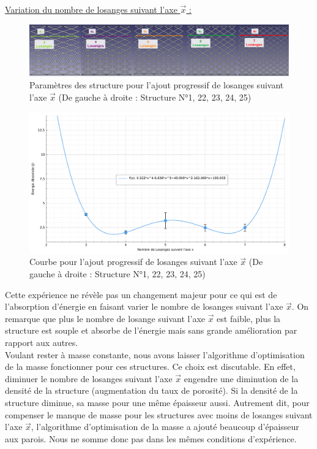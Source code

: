 \documentclass[a4paper]{article}
\begin{document}
	\underline{Variation du nombre de losanges suivant l'axe $\vec{x}$ :}
	
	\begin{figure}[H]
		\centering
		\includegraphics[width=14cm]{Images/7/7_4/7_4_8/gradient_losange_x.pdf}
		\caption{Paramètres des structure pour l'ajout progressif de losanges suivant l'axe $\vec{x}$ (De gauche à droite : Structure N°1, 22, 23, 24, 25)}
	\end{figure}

	\begin{figure}[H]
		\centering
		\includegraphics[width=13cm]{Images/7/7_4/7_4_8/nb_losange_x.pdf}
		\caption{Courbe pour l'ajout progressif de losanges suivant l'axe $\vec{x}$ (De gauche à droite : Structure N°1, 22, 23, 24, 25)}
	\end{figure}

	Cette expérience ne révèle pas un changement majeur pour ce qui est de l'absorption d'énergie en faisant varier le nombre de losanges suivant l'axe $\vec{x}$. On remarque que plus le nombre de losange suivant l'axe $\vec{x}$ est faible, plus la structure est souple et absorbe de l'énergie mais sans grande amélioration par rapport aux autres.\\
	
	Voulant rester à masse constante, nous avons laisser l'algorithme d'optimisation de la masse fonctionner pour ces structures. Ce choix est discutable. En effet, diminuer le nombre de losanges suivant l'axe $\vec{x}$ engendre une diminution de la densité de la structure (augmentation du taux de porosité). Si la densité de la structure diminue, sa masse pour une même épaisseur aussi. Autrement dit, pour compenser le manque de masse pour les structures avec moins de losanges suivant l'axe $\vec{x}$, l'algorithme d'optimisation de la masse a ajouté beaucoup d'épaisseur aux parois. Nous ne somme donc pas dans les mêmes conditions d'expérience.
\end{document}
